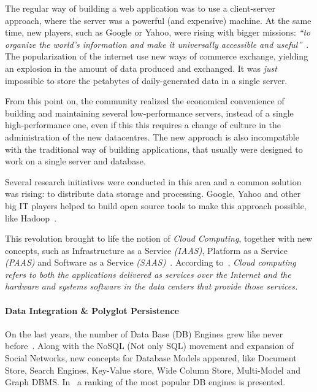 \documentclass[]{tEIS2e}
\theoremstyle{plain}
\theoremstyle{remark}
\begin{document}
The regular way of building a web application was to use a client-server approach, where the server was a powerful (and expensive) machine. 
At the same time, new players, such as Google or Yahoo, were rising with bigger missions: \textit{``to organize the world's information and make it universally accessible and useful''}~\citep{Spector:2012:GHA:2209249.2209262}. 
The popularization of the internet use new ways of commerce exchange, yielding an explosion in the amount of data produced and exchanged. 
It was \textit{just} impossible to store the petabytes of daily-generated data in a single server. 

From this point on, the community realized the economical convenience of building and maintaining several low-performance servers, instead of a single high-performance one, even if this this requires a change of culture in the administration of the new datacentres.
The new approach is also incompatible with the traditional way of building applications, that usually were designed to work on a single server and database. 

Several research initiatives were conducted in this area and a common solution was rising: to distribute data storage and processing. 
Google, Yahoo and other big IT players helped to build open source tools to make this approach possible, like Hadoop~\citep{5496972}.

This revolution brought to life the notion of \textit{Cloud Computing}, together with new concepts, such as Infrastructure as a Service \textit{(IAAS)}, Platform as a Service \textit{(PAAS)} and Software as a Service \textit{(SAAS)}~\citep{AViewOfCloudComputing}.
According to~\citep{AViewOfCloudComputing}, \textit{Cloud computing refers to both the applications delivered as services over the Internet and the hardware and systems software in the data centers that provide those services.} 


\paragraph*{Data Integration \& Polyglot Persistence}
On the last years, the number of Data Base (DB) Engines grew like never before~\citep{dbranking}. 
Along with the NoSQL (Not only SQL) movement and expansion of Social Networks, new concepts for Database Models appeared, like Document Store, Search Engines, Key-Value store, Wide Column Store, Multi-Model and Graph DBMS. 
In~\citep{dbranking} a ranking of the most popular DB engines is presented.
\end{document}
